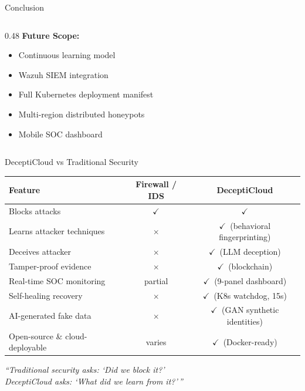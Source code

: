 \documentclass[aspectratio=169,12pt]{beamer}
\newcommand{\yes}{\textcolor{dcGreen}{$\checkmark$}}
\newcommand{\no}{\textcolor{dcRed}{$\times$}}
\begin{document}
\begin{frame}{Conclusion}
\begin{columns}[T]
\begin{column}{0.48\textwidth}
      \textbf{\textcolor{dcPurple}{Future Scope:}}
      \begin{itemize}\small
        \item Continuous learning model
        \item Wazuh SIEM integration
        \item Full Kubernetes deployment manifest
        \item Multi-region distributed honeypots
        \item Mobile SOC dashboard
      \end{itemize}
    \end{column}
  \end{columns}
\end{frame}

\begin{frame}{DeceptiCloud vs Traditional Security}
  \centering\small
  \begin{tabular}{@{} p{4.4cm} c c @{}}
    \toprule
    \rowcolor{dcMid}
    \textcolor{dcCyan}{Feature} &
    \textcolor{dcGray}{Firewall / IDS} &
    \textcolor{dcGreen}{DeceptiCloud}\\
    \midrule
    Blocks attacks                  & \yes & \yes\\
    \rowcolor{dcDark}
    Learns attacker techniques      & \no  & \yes\ (behavioral fingerprinting)\\
    Deceives attacker               & \no  & \yes\ (LLM deception)\\
    \rowcolor{dcDark}
    Tamper-proof evidence           & \no  & \yes\ (blockchain)\\
    Real-time SOC monitoring        & partial & \yes\ (9-panel dashboard)\\
    \rowcolor{dcDark}
    Self-healing recovery           & \no  & \yes\ (K8s watchdog, 15s)\\
    AI-generated fake data          & \no  & \yes\ (GAN synthetic identities)\\
    \rowcolor{dcDark}
    Open-source \& cloud-deployable & varies & \yes\ (Docker-ready)\\
    \bottomrule
  \end{tabular}

  \vspace{0.4em}
  \begin{block}{}
    \centering\textit{``Traditional security asks: `Did we block it?'\\
    DeceptiCloud asks: `What did we learn from it?'\,''}
  \end{block}
\end{frame}
\end{document}
